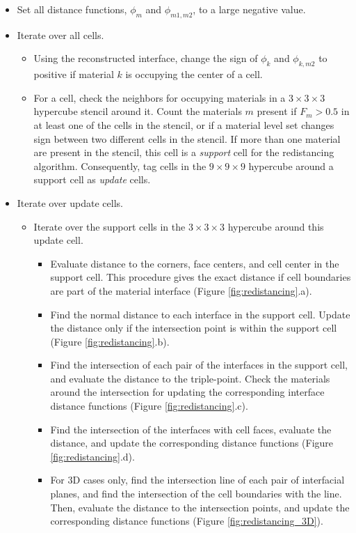 \documentclass[]{article}
\begin{document}
\begin{itemize}
\item Set all distance functions, $\phi_m$ and $\phi_{m1,m2}$, 
to a large negative value.
\item Iterate over all cells.  
  \begin{itemize}
  \item Using the reconstructed interface, change the sign of 
    $\phi_k$ and $\phi_{k,m2}$ to positive if material 
    $k$ is occupying the
    center of a cell.
  \item For a cell, check the neighbors for 
    occupying materials in a  $3 \times 3 \times 3$ 
    hypercube stencil around it. Count the
    materials $m$ present if $F_m>0.5$ in at 
    least one of the cells in the stencil, or if a 
    material level set changes sign between two 
    different cells in the stencil. If more than one 
    material are present in the stencil, this cell is 
    a \emph{support} cell for the redistancing 
    algorithm. Consequently, tag cells in the $9 \times 9 \times 9$ 
    hypercube around a support cell as \emph{update} cells.
 \end{itemize}
 \item Iterate over update cells.
   \begin{itemize}
   \item Iterate over the support cells in the $3 \times 3 \times 3$  
    hypercube around this update cell. 
     \begin{itemize}
     \item Evaluate distance to the corners, face centers, and 
      cell center in the support cell. This procedure gives 
      the exact distance if cell boundaries are 
      part of the material interface (Figure \ref{fig:redistancing}.a).
     \item Find the normal distance to each interface in the 
      support cell. Update the distance only if the 
      intersection point is within the support cell 
      (Figure \ref{fig:redistancing}.b).
     \item Find the intersection of each pair of the interfaces 
      in the support cell, and evaluate the distance 
      to the triple-point. Check the materials around the 
      intersection for updating the corresponding interface 
      distance functions (Figure \ref{fig:redistancing}.c).
     \item Find the intersection of the interfaces with 
      cell faces, evaluate the distance, and update the 
      corresponding distance functions (Figure \ref{fig:redistancing}.d).
     \item For 3D cases only, find the intersection line of 
       each pair of interfacial planes, and find the intersection 
      of the cell boundaries with the line. 
      Then, evaluate the distance to the intersection points, and update the corresponding distance functions (Figure \ref{fig:redistancing_3D}).
     \end{itemize}
   \end{itemize}
\end{itemize}
\end{document}
